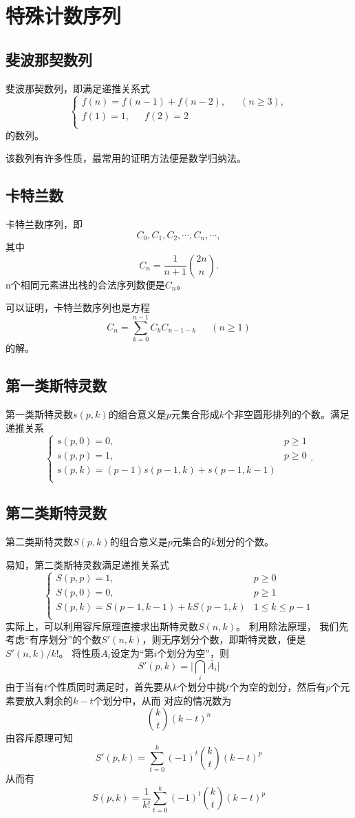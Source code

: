 \documentclass[a4paper,11pt]{article}%
\theoremstyle{remark}
\theoremstyle{remark}
\theoremstyle{definition}
\theoremstyle{definition}
\theoremstyle{definition}
\newcommand*{\abs}[1]{\lvert #1 \rvert}
\begin{document}
\section{特殊计数序列}
\subsection{斐波那契数列}
斐波那契数列，即满足递推关系式
\[ 
\begin{cases}
    f(n)=f(n-1)+f(n-2),\phantom{111}(n\geq 3),\\
    f(1)=1,\phantom{111}f(2)=2\\
\end{cases}    
\]
的数列。

该数列有许多性质，最常用的证明方法便是数学归纳法。
\subsection{卡特兰数}
卡特兰数序列，即 
\[C_0,C_1,C_2,\cdots,C_n,\cdots,\]
其中 
\[C_n=\frac{1}{n+1}\binom{2n}{n}.\]
n个相同元素进出栈的合法序列数便是$C_n$。

可以证明，卡特兰数序列也是方程 
\[C_n=\sum_{k=0}^{n-1}C_kC_{n-1-k}\phantom{111}(n\geq 1)\]
的解。
\subsection{第一类斯特灵数}
第一类斯特灵数$s(p,k)$的组合意义是$p$元集合形成$k$个非空圆形排列的个数。满足递推关系 
\[ 
\begin{cases}
    s(p,0)=0,&p\geq 1\\
    s(p,p)=1,&p\geq 0\\
    s(p,k)=(p-1)s(p-1,k)+s(p-1,k-1)\\
\end{cases}    
.\]
\subsection{第二类斯特灵数}
第二类斯特灵数$S(p,k)$的组合意义是$p$元集合的$k$划分的个数。

易知，第二类斯特灵数满足递推关系式
\[ 
\begin{cases}
    S(p,p)=1,&p\geq 0\\
    S(p,0)=0,&p\geq 1\\
    S(p,k)=S(p-1,k-1)+kS(p-1,k)&1\leq k\leq p-1\\
\end{cases}    
\]
实际上，可以利用容斥原理直接求出斯特灵数$S(n,k)$。 利用除法原理，
我们先考虑“有序划分”的个数$S'(n,k)$，则无序划分个数，即斯特灵数，便是$S'(n,k)/k!$。
将性质$A_i$设定为“第$i$个划分为空”，则 
\[S'(p,k)=\abs{\bigcap_{i}\bar{A_i}}\]
由于当有$t$个性质同时满足时，首先要从$k$个划分中挑$t$个为空的划分，然后有$p$个元素要放入剩余的$k-t$个划分中，从而
对应的情况数为 
\[\binom{k}{t}(k-t)^n\]
由容斥原理可知 
\[S'(p,k)=\sum_{t=0}^{k}(-1)^t\binom{k}{t}(k-t)^p\]
从而有
\[S(p,k)=\frac{1}{k!}\sum_{t=0}^{k}(-1)^t\binom{k}{t}(k-t)^p\]
\end{document}
